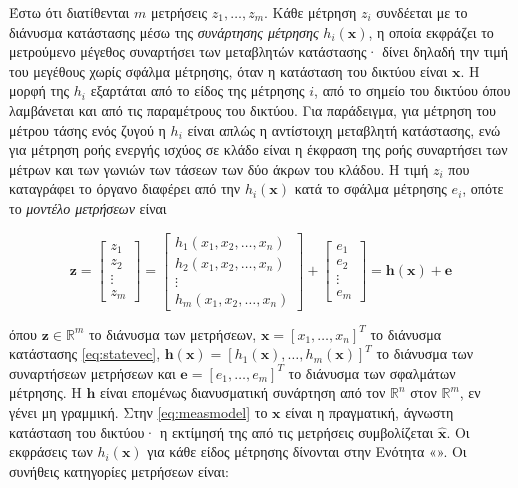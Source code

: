 Έστω ότι διατίθενται $m$ μετρήσεις $z_1, \ldots, z_m$. Κάθε μέτρηση $z_i$ συνδέεται με το
διάνυσμα κατάστασης μέσω της \emph{συνάρτησης μέτρησης} $h_i(\mathbf{x})$, η οποία εκφράζει το
μετρούμενο μέγεθος συναρτήσει των μεταβλητών κατάστασης· δίνει δηλαδή την τιμή του μεγέθους
χωρίς σφάλμα μέτρησης, όταν η κατάσταση του δικτύου είναι $\mathbf{x}$. Η μορφή της $h_i$
εξαρτάται από το είδος της μέτρησης $i$, από το σημείο του δικτύου όπου λαμβάνεται και από τις
παραμέτρους του δικτύου. Για παράδειγμα, για μέτρηση του μέτρου τάσης ενός ζυγού η $h_i$ είναι
απλώς η αντίστοιχη μεταβλητή κατάστασης, ενώ για μέτρηση ροής ενεργής ισχύος σε κλάδο είναι η
έκφραση της ροής συναρτήσει των μέτρων και των γωνιών των τάσεων των δύο άκρων του κλάδου. Η
τιμή $z_i$ που καταγράφει το όργανο διαφέρει από την $h_i(\mathbf{x})$ κατά το σφάλμα μέτρησης
$e_i$, οπότε το \emph{μοντέλο μετρήσεων} είναι

\begin{equation}
\mathbf{z} =
\begin{bmatrix} z_1 \\ z_2 \\ \vdots \\ z_m \end{bmatrix}
=
\begin{bmatrix} h_1(x_1, x_2, \ldots, x_n) \\ h_2(x_1, x_2, \ldots, x_n) \\ \vdots \\
                h_m(x_1, x_2, \ldots, x_n) \end{bmatrix}
+
\begin{bmatrix} e_1 \\ e_2 \\ \vdots \\ e_m \end{bmatrix}
= \mathbf{h}(\mathbf{x}) + \mathbf{e}
\label{eq:measmodel}
\end{equation}

όπου $\mathbf{z} \in \mathbb{R}^{m}$ το διάνυσμα των μετρήσεων,
$\mathbf{x} = \left[x_1, \ldots, x_n\right]^{T}$ το διάνυσμα κατάστασης \eqref{eq:statevec},
$\mathbf{h}(\mathbf{x}) = \left[h_1(\mathbf{x}), \ldots, h_m(\mathbf{x})\right]^{T}$ το
διάνυσμα των συναρτήσεων μετρήσεων και $\mathbf{e} = \left[e_1, \ldots, e_m\right]^{T}$ το
διάνυσμα των σφαλμάτων μέτρησης. Η $\mathbf{h}$ είναι επομένως διανυσματική συνάρτηση από τον
$\mathbb{R}^{n}$ στον $\mathbb{R}^{m}$, εν γένει μη γραμμική. Στην \eqref{eq:measmodel} το
$\mathbf{x}$ είναι η πραγματική, άγνωστη κατάσταση του δικτύου· η εκτίμησή της από τις
μετρήσεις συμβολίζεται $\hat{\mathbf{x}}$. Οι εκφράσεις των $h_i(\mathbf{x})$ για κάθε είδος
μέτρησης δίνονται στην Ενότητα «». Οι συνήθεις κατηγορίες μετρήσεων
είναι:

